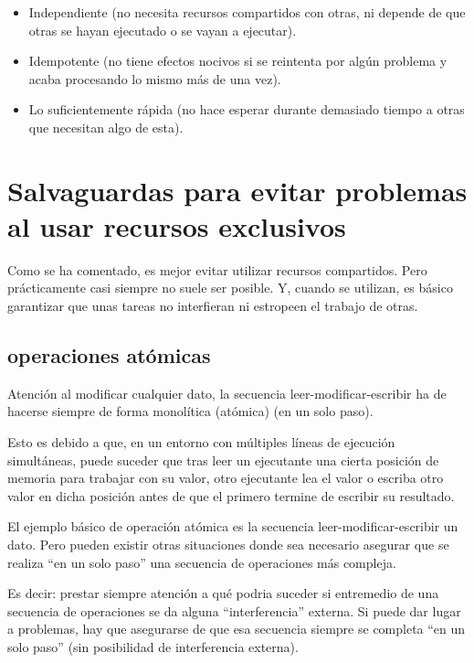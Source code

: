 \documentclass[spanish,12pt,a4paper,final,oneside]{book}
\begin{document}
\begin{itemize}

\item Independiente (no necesita recursos compartidos con otras, ni depende de que otras se hayan ejecutado o se vayan a ejecutar). 

\item Idempotente (no tiene efectos nocivos si se reintenta por algún problema y acaba procesando lo mismo más de una vez).

\item Lo suficientemente rápida (no hace esperar durante demasiado tiempo a otras que necesitan algo de esta).


\end{itemize}



\section{Salvaguardas para evitar problemas al usar recursos exclusivos}

Como se ha comentado, es mejor evitar utilizar recursos compartidos. Pero prácticamente casi siempre no suele ser posible. Y, cuando se utilizan, es básico garantizar que unas tareas no interfieran ni estropeen el trabajo de otras. 

\subsection{operaciones atómicas}
Atención al modificar cualquier dato, la secuencia leer-modificar-escribir ha de hacerse siempre de forma monolítica (atómica) (en un solo paso).

Esto es debido a que, en un entorno con múltiples líneas de ejecución simultáneas, puede suceder que tras leer un ejecutante una cierta posición de memoria para trabajar con su valor, otro ejecutante lea el valor o escriba otro valor en dicha posición antes de que el primero termine de escribir su resultado. 

El ejemplo básico de operación atómica es la secuencia leer-modificar-escribir un dato. Pero pueden existir otras situaciones donde sea necesario asegurar que se realiza ``en un solo paso'' una secuencia de operaciones más compleja. 

Es decir: prestar siempre atención a qué podria suceder si entremedio de una secuencia de operaciones se da alguna ``interferencia'' externa. Si puede dar lugar a problemas, hay que asegurarse de que esa secuencia siempre se completa ``en un solo paso'' (sin posibilidad de interferencia externa).
\end{document}
